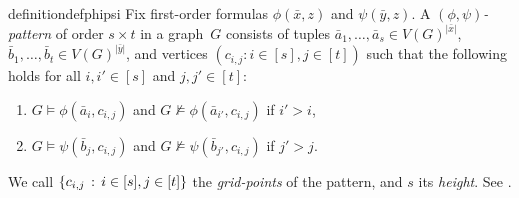 \begin{restatable}{definition}{defphipsi}\label{def:phi-psi-patterns}
    Fix first-order formulas $\phi(\bar x,z)$ and $\psi(\bar y,z)$. A \emph{$(\phi,\psi)$-pattern} of order $s \times t$ in a graph~$G$ consists of tuples $\bar a_1, \ldots, \bar a_s \in V(G)^{|\bar x|}$, $\bar b_1, \ldots, \bar b_t \in V(G)^{|\bar y|}$, and vertices ${(c_{i,j}: i\in [s],j\in [t])}$ such that the following holds
    for all $i,i'\in [s]$ and $j,j'\in[t]$:
    \begin{enumerate}
        \item $G\models \phi(\bar a_i,c_{i,j})$ 
        and $G\not\models \phi(\bar a_{i'},c_{i,j})$ if $i'>i$,
        \item $G\models \psi(\bar b_j,c_{i,j})$ 
        and $G\not\models \psi(\bar b_{j'},c_{i,j})$ if $j'>j$.
    \end{enumerate}
\end{restatable}
\noindent We call $\{c_{i,j} \,:\, i\in[s],j\in[t] \}$ the \emph{grid-points} of the pattern, and $s$ its \emph{height}. See .
